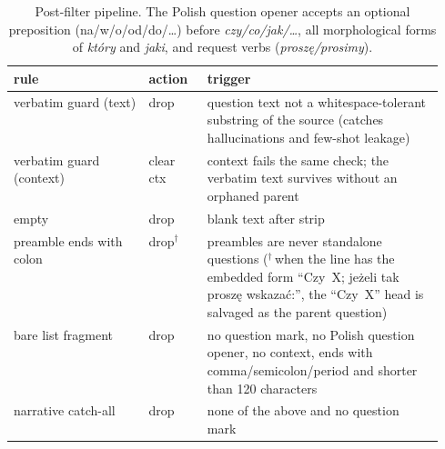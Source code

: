\begin{table}[!htb]
\centering
\footnotesize
\begin{tabular}{@{}llp{0.55\linewidth}@{}}
\toprule
\textbf{rule} & \textbf{action} & \textbf{trigger} \\
\midrule
verbatim guard (text)    & drop       & question text not a
  whitespace-tolerant substring of the source (catches
  hallucinations and few-shot leakage) \\
verbatim guard (context) & clear ctx  & context fails the same
  check; the verbatim text survives without an orphaned parent \\
empty                    & drop       & blank text after strip \\
preamble ends with colon & drop$^{\dagger}$ & preambles are never
  standalone questions
  ($^{\dagger}$\,when the line has the embedded form
  ``Czy~X; je\.zeli tak prosz\k{e} wskaza\'c:'', the
  ``Czy~X'' head is salvaged as the parent question) \\
bare list fragment       & drop       & no question mark, no Polish
  question opener, no context, ends with comma/semicolon/period and
  shorter than 120 characters \\
narrative catch-all      & drop       & none of the above and no
  question mark \\
\bottomrule
\end{tabular}
\caption{Post-filter pipeline. The Polish question opener accepts an
optional preposition (na/w/o/od/do/\ldots) before
\textit{czy/co/jak/\ldots}, all morphological forms of
\textit{kt\'ory} and \textit{jaki}, and request verbs
(\textit{prosz\k{e}/prosimy}).}
\label{tab:postfilter}
\end{table}


